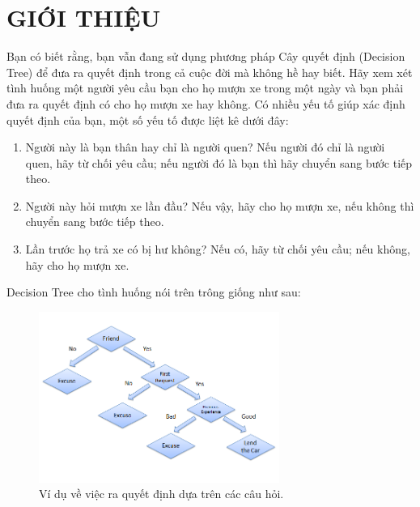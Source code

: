 \chapter {GIỚI THIỆU}

Bạn có biết rằng, bạn vẫn đang sử dụng phương pháp Cây quyết định (Decision Tree)
để đưa ra quyết định trong cả cuộc đời mà không hề hay biết.
Hãy xem xét tình huống một người yêu cầu bạn cho họ mượn xe trong một ngày
và bạn phải đưa ra quyết định có cho họ mượn xe hay không. Có nhiều yếu tố
giúp xác định quyết định của bạn, một số yếu tố được liệt kê dưới đây:

\begin{enumerate}
    \item Người này là bạn thân hay chỉ là người quen?
    Nếu người đó chỉ là người quen, hãy từ chối yêu cầu;
    nếu người đó là bạn thì hãy chuyển sang bước tiếp theo.
    \item Người này hỏi mượn xe lần đầu? Nếu vậy, hãy cho họ mượn xe,
    nếu không thì chuyển sang bước tiếp theo.
    \item Lần trước họ trả xe có bị hư không? Nếu có, hãy từ chối yêu cầu;
    nếu không, hãy cho họ mượn xe.
\end{enumerate}

Decision Tree cho tình huống nói trên trông giống như sau:

\begin{figure}[h!]
    \centering
    \includegraphics[width=0.7\textwidth]{thesis/decision-tree/intro/dt_ex1.png}
    \caption{Ví dụ về việc ra quyết định dựa trên các câu hỏi.}
    \label{fig:dt_ex1}
\end{figure}
